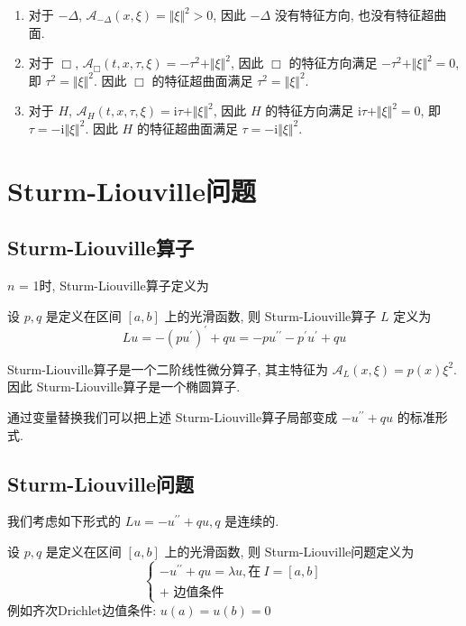 \documentclass[11pt]{ctexart}[UTF8]
\begin{document}
\begin{example}
    \begin{enumerate}
        \item 对于 $-\Delta$, $\mathscr{A}_{-\Delta}(x,\xi) = \Vert\xi\Vert^2 > 0$, 因此 $-\Delta$ 没有特征方向, 也没有特征超曲面.\\
        \item 对于 $\Box$, $\mathscr{A}_\Box(t,x,\tau,\xi) = -\tau^2 + \Vert\xi\Vert^2$, 因此 $\Box$ 的特征方向满足 $-\tau^2 + \Vert\xi\Vert^2 = 0$, 即 $\tau^2 = \Vert\xi\Vert^2$. 因此 $\Box$ 的特征超曲面满足 $\tau^2 = \Vert\xi\Vert^2$.\\
        \item 对于 $H$, $\mathscr{A}_H(t,x,\tau,\xi) = \mathrm{i}\tau + \Vert\xi\Vert^2$, 因此 $H$ 的特征方向满足 $\mathrm{i}\tau + \Vert\xi\Vert^2 = 0$, 即 $\tau = -\mathrm{i} \Vert\xi\Vert^2$. 因此 $H$ 的特征超曲面满足 $\tau = -\mathrm{i} \Vert\xi\Vert^2$.
    \end{enumerate}
\end{example}

\newpage
\section{Sturm-Liouville问题}

\subsection{Sturm-Liouville算子}
$n$ = 1时, Sturm-Liouville算子定义为
\begin{definition}
    设 $p, q$ 是定义在区间 $[a,b]$ 上的光滑函数, 则 Sturm-Liouville算子 $L$ 定义为
\begin{equation*}
    L u = -(pu^{\prime})^{\prime} + q u= -p u^{\prime\prime} - p^{\prime} u^{\prime} + q u
\end{equation*}
\end{definition}
\begin{remark}
    Sturm-Liouville算子是一个二阶线性微分算子, 其主特征为 $\mathscr{A}_L(x,\xi) = p(x) \xi^2$. 因此 Sturm-Liouville算子是一个椭圆算子.
\end{remark}
通过变量替换我们可以把上述 Sturm-Liouville算子局部变成 $-u^{\prime\prime}+qu$ 的标准形式.
\subsection{Sturm-Liouville问题}
我们考虑如下形式的 $Lu = -u^{\prime\prime}+qu, q$ 是连续的.
\begin{definition}
    设 $p, q$ 是定义在区间 $[a,b]$ 上的光滑函数, 则 Sturm-Liouville问题定义为
\begin{equation*}
    \begin{cases}
        -u^{\prime\prime} + q u = \lambda u, \text{在}\  I=[a,b] \\
        \text{+ 边值条件}
    \end{cases}
\end{equation*}
例如齐次Drichlet边值条件: $u(a) = u(b) = 0$
\end{definition}
\end{document}
